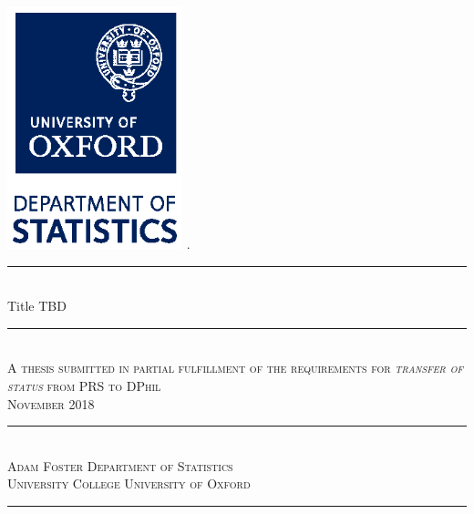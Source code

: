 \documentclass[TRANSFER_THESIS.tex]{subfiles}
\begin{document}
\thispagestyle{empty}
\begin{titlepage}
\begin{center}
\hfill \includegraphics[width=2.0in]{figures/Dept_Stats_logo_vertical_CMYK.eps} \hfill . \\
\vspace{3cm}
\rule{150mm}{0.5mm} \\ [16pt]
\Huge Title TBD
\rule{150mm}{0.5mm} \\ [4pt]
\vfill
\large \textsc{A thesis submitted in partial fulfillment of the requirements for \textit{transfer of status} from PRS to DPhil} \\
\vspace{1cm}
\large \textsc{November 2018} \\
\rule{\textwidth}{0.5mm} \\ [4pt]
{\fontsize{14}{14}\textsc{Adam Foster} \hfill \textsc{Department of Statistics}} \\ [8pt]
{\fontsize{14}{14} \textsc{University College \hfill University of Oxford}}
\rule{\textwidth}{0.5mm} \\ [4pt]
\end{center}
\vspace{2cm}
\end{titlepage}
\end{document}
